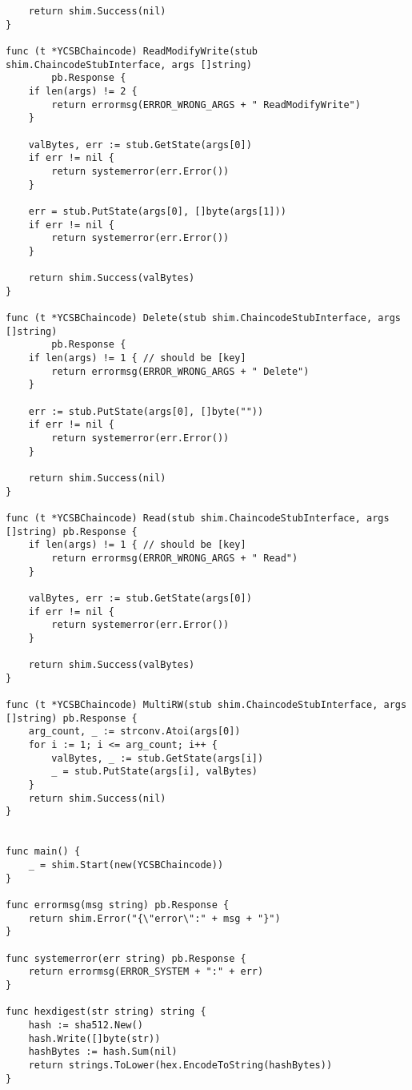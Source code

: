 \begin{lstlisting}
	return shim.Success(nil)
}

func (t *YCSBChaincode) ReadModifyWrite(stub shim.ChaincodeStubInterface, args []string) 
        pb.Response {
	if len(args) != 2 { 
		return errormsg(ERROR_WRONG_ARGS + " ReadModifyWrite")
	}

	valBytes, err := stub.GetState(args[0])
	if err != nil {
		return systemerror(err.Error())
	}

	err = stub.PutState(args[0], []byte(args[1]))
	if err != nil {
		return systemerror(err.Error())
	}

	return shim.Success(valBytes)
}

func (t *YCSBChaincode) Delete(stub shim.ChaincodeStubInterface, args []string) 
        pb.Response {
	if len(args) != 1 { // should be [key]
		return errormsg(ERROR_WRONG_ARGS + " Delete")
	}

	err := stub.PutState(args[0], []byte(""))
	if err != nil {
		return systemerror(err.Error())
	}

	return shim.Success(nil)
}

func (t *YCSBChaincode) Read(stub shim.ChaincodeStubInterface, args []string) pb.Response {
	if len(args) != 1 { // should be [key]
		return errormsg(ERROR_WRONG_ARGS + " Read")
	}

	valBytes, err := stub.GetState(args[0])
	if err != nil {
		return systemerror(err.Error())
	}

	return shim.Success(valBytes)
}

func (t *YCSBChaincode) MultiRW(stub shim.ChaincodeStubInterface, args []string) pb.Response {
	arg_count, _ := strconv.Atoi(args[0])
	for i := 1; i <= arg_count; i++ {
		valBytes, _ := stub.GetState(args[i])
		_ = stub.PutState(args[i], valBytes)
	}
	return shim.Success(nil)
}


func main() {
	_ = shim.Start(new(YCSBChaincode))
}

func errormsg(msg string) pb.Response {
	return shim.Error("{\"error\":" + msg + "}")
}

func systemerror(err string) pb.Response {
	return errormsg(ERROR_SYSTEM + ":" + err)
}

func hexdigest(str string) string {
	hash := sha512.New()
	hash.Write([]byte(str))
	hashBytes := hash.Sum(nil)
	return strings.ToLower(hex.EncodeToString(hashBytes))
}

\end{lstlisting}


